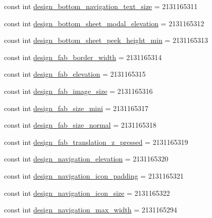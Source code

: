\begin{CompactItemize}
\item 
const int \hyperlink{class__2doo_1_1_droid_1_1_resource_1_1_dimension_fb1fa45311098203f5490a95669497a6}{design\_\-bottom\_\-navigation\_\-text\_\-size} = 2131165311
\item 
const int \hyperlink{class__2doo_1_1_droid_1_1_resource_1_1_dimension_b361d2901070a36f8393202655da48f5}{design\_\-bottom\_\-sheet\_\-modal\_\-elevation} = 2131165312
\item 
const int \hyperlink{class__2doo_1_1_droid_1_1_resource_1_1_dimension_722b5c7a38e2807b554b5ea1dbbc8272}{design\_\-bottom\_\-sheet\_\-peek\_\-height\_\-min} = 2131165313
\item 
const int \hyperlink{class__2doo_1_1_droid_1_1_resource_1_1_dimension_d10c79e3a86eebdc5b8bc16926e01960}{design\_\-fab\_\-border\_\-width} = 2131165314
\item 
const int \hyperlink{class__2doo_1_1_droid_1_1_resource_1_1_dimension_77650fd0cd0d78c130fcd59ae70ab365}{design\_\-fab\_\-elevation} = 2131165315
\item 
const int \hyperlink{class__2doo_1_1_droid_1_1_resource_1_1_dimension_b02454c191f079239ed466354197591b}{design\_\-fab\_\-image\_\-size} = 2131165316
\item 
const int \hyperlink{class__2doo_1_1_droid_1_1_resource_1_1_dimension_e87534714718a4784225f66ad51caead}{design\_\-fab\_\-size\_\-mini} = 2131165317
\item 
const int \hyperlink{class__2doo_1_1_droid_1_1_resource_1_1_dimension_a578ec203d520782d9141adba9de1747}{design\_\-fab\_\-size\_\-normal} = 2131165318
\item 
const int \hyperlink{class__2doo_1_1_droid_1_1_resource_1_1_dimension_0c1521c212c2976572dc4ce3888f30ad}{design\_\-fab\_\-translation\_\-z\_\-pressed} = 2131165319
\item 
const int \hyperlink{class__2doo_1_1_droid_1_1_resource_1_1_dimension_eea833ce8b71499397528599193d64ae}{design\_\-navigation\_\-elevation} = 2131165320
\item 
const int \hyperlink{class__2doo_1_1_droid_1_1_resource_1_1_dimension_87c6f898ed65def4244a70ebec3304c3}{design\_\-navigation\_\-icon\_\-padding} = 2131165321
\item 
const int \hyperlink{class__2doo_1_1_droid_1_1_resource_1_1_dimension_71b003728aed8ed582d1e498c6acf1f4}{design\_\-navigation\_\-icon\_\-size} = 2131165322
\item 
const int \hyperlink{class__2doo_1_1_droid_1_1_resource_1_1_dimension_63aee9863fab4897801f24b83d289e7c}{design\_\-navigation\_\-max\_\-width} = 2131165294

\end{CompactItemize}
